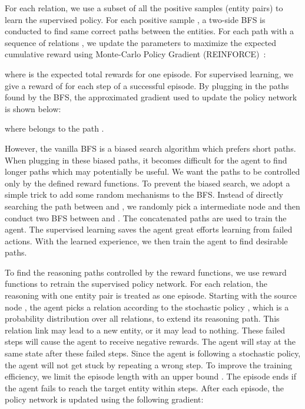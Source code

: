 \documentclass[11pt,letterpaper]{article}
\begin{document}
 
 For each relation, we use a subset of all the positive samples (entity pairs) to 
learn the supervised policy. For each positive sample , a two-side BFS is conducted to find same correct paths between the entities. For each path  with a sequence of relations , we update the parameters  to maximize the expected cumulative reward using Monte-Carlo Policy Gradient (REINFORCE)~\cite{williams1992simple}:

where  is the expected total rewards for one episode. For supervised learning, we give a reward of  for each step of a successful episode. By plugging in the paths found by the BFS, the approximated gradient used to update the policy network is shown below:

where  belongs to the path .

However, the vanilla BFS is a biased search algorithm which prefers short paths. When plugging in these biased paths, it becomes difficult for the agent to find longer paths which may potentially be useful. We want the paths to be controlled only by the defined reward functions. To prevent the biased search, we adopt a simple trick to add some random mechanisms to the BFS. Instead of directly searching the path between  and , we randomly pick a intermediate node  and then conduct two BFS between  and . The concatenated paths are used to train the agent. The supervised learning saves the agent great efforts learning from failed actions. With the learned experience, we then train the agent to find desirable paths.


 To find the reasoning paths controlled by the reward functions, we use reward functions to retrain the supervised policy network. For each relation, the reasoning with one entity pair is treated as one episode. Starting with the source node , the agent picks a relation according to the stochastic policy , which is a probability distribution over all relations, to extend its reasoning path. This relation link may lead to a new entity, or it may lead to nothing. These failed steps will cause the agent to receive negative rewards. The agent will stay at the same state after these failed steps. Since the agent is following a stochastic policy, the agent will not get stuck by repeating a wrong step. To improve the training efficiency, we limit the episode length with an upper bound . The episode ends if the agent fails to reach the target entity within  steps. After each episode, the policy network is updated using the following gradient:
\end{document}
